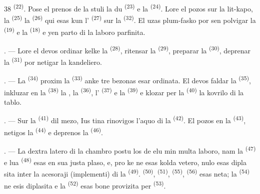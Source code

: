 \begin{VUpage}[40]{38}
\VUcontinue
{} \textsuperscript{(22)}. Pose el prenos de la stuli la du \cc
{} \textsuperscript{(23)} e la  \textsuperscript{(24)}. Lore el pozos sur la\nl
lit-kapo, la  \textsuperscript{(25)} la \cc
{} \textsuperscript{(26)} qui esas kun l' \textsuperscript{(27)} sur\nl
la  \textsuperscript{(32)}. El uzas plum-fasko por sen\cc
polvigar la  \textsuperscript{(19)} e la  \textsuperscript{(18)} e yen\nl
parto di la laboro parfinita.

. --- Lore el devos ordinar kelke la \cc
{} \textsuperscript{(28)}, ritensar la  \textsuperscript{(29)}, preparar la\nl
{} \textsuperscript{(30)}, deprenar la  \textsuperscript{(31)} por\nl
netigar la kandeliero.

\VUsaut{5.0mm}
\VUsaut{3.0mm}

. --- La  \textsuperscript{(34)} proxim la  \textsuperscript{(33)}\nl
anke tre bezonas esar ordinata. El devos faldar\nl
la  \textsuperscript{(35)}, inkluzar en la  \textsuperscript{(38)} la\nl
{}, la  \textsuperscript{(36)}, l' \textsuperscript{(37)} e la  \textsuperscript{(39)}\nl
e klozar per la  \textsuperscript{(40)} la kovrilo di la tablo.

. --- Sur la  \textsuperscript{(41)} dil mezo, Ius\cc
tina rinovigos l'aquo di la  \textsuperscript{(42)}. El pozos\nl
{} en la  \textsuperscript{(43)}, netigos la \cc
{} \textsuperscript{(44)} e deprenos la  \textsuperscript{(46)}.

. --- La dextra latero di la chambro postu\cc
los de elu min multa laboro, nam la \cc
{} \textsuperscript{(47)} e lua  \textsuperscript{(48)} esas en sua justa plaso,\nl
e, pro ke ne esas kolda vetero, nulo esas dipla\cc
sita inter la acesoraji (implementi) di la \cc
{} \textsuperscript{(49)}.  \textsuperscript{(50)},  \textsuperscript{(51)},  \textsuperscript{(55)},\nl
{} \textsuperscript{(56)} esas neta; la  \textsuperscript{(54)}\nl
ne esis diplasita e la  \textsuperscript{(52)} esas bone\nl
provizita per  \textsuperscript{(53)}.
\end{VUpage}

